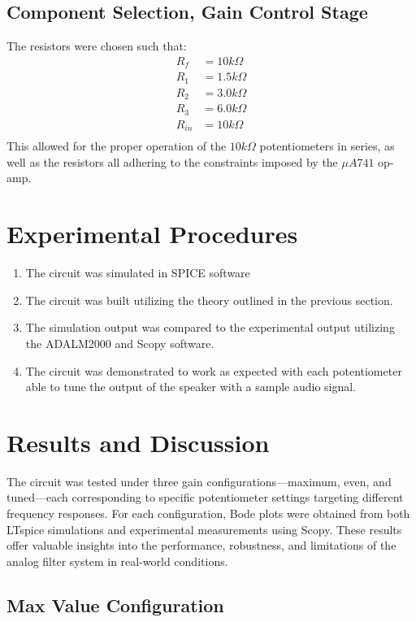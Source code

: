 \documentclass[12pt]{article}
\begin{document}
\subsection{Component Selection, Gain Control Stage}
The resistors were chosen such that:
\begin{align*}
	R_f    & = 10k\Omega  \\
	R_1    & = 1.5k\Omega \\
	R_2    & = 3.0k\Omega \\
	R_3    & = 6.0k\Omega \\
	R_{in} & = 10k\Omega  \\
\end{align*}
This allowed for the proper operation of the $10k\Omega$ potentiometers in
series, as well as the resistors all adhering to the constraints imposed by the
$\mu A741$ op-amp.
\section{Experimental Procedures}
\begin{enumerate}
	\item The circuit was simulated in SPICE software
	\item The circuit was built utilizing the theory outlined in the previous section.
	\item The simulation output was compared to the experimental output
	      utilizing\\
	      the ADALM2000 and Scopy software.
	\item The circuit was demonstrated to work as expected with each potentiometer
	      able to tune the output of the speaker with a sample audio signal.
\end{enumerate}

\section{Results and Discussion}

The circuit was tested under three gain configurations—maximum, even, and tuned—each corresponding to specific potentiometer settings targeting different frequency responses. For each configuration, Bode plots were obtained from both LTspice simulations and experimental measurements using Scopy. These results offer valuable insights into the performance, robustness, and limitations of the analog filter system in real-world conditions.

\subsection{Max Value Configuration}
\end{document}
